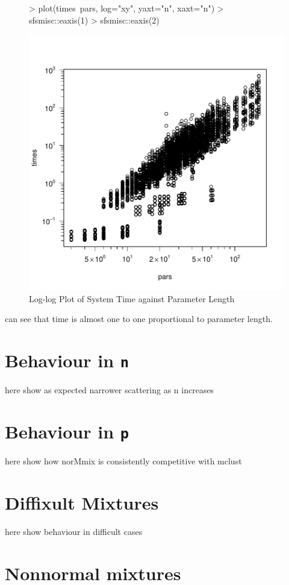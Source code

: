 \begin{figure}[h]
    \centering
\begin{Schunk}
\begin{Sinput}
>     plot(times~pars, log="xy", yaxt="n", xaxt="n")
>     sfsmisc::eaxis(1)
>     sfsmisc::eaxis(2)
\end{Sinput}
\end{Schunk}
\includegraphics{chapter3-figtime}
    \caption{Log-log Plot of System Time against Parameter Length}
    \label{fig:time}
\end{figure}

can see that time is almost one to one proportional to parameter length.

\section{Behaviour in {\tt n}}

here show as expected narrower scattering as n increases

\section{Behaviour in {\tt p}}

here show how norMmix is consistently competitive with mclust

\section{Diffixult Mixtures}

here show behaviour in difficult cases

\section{Nonnormal mixtures}

